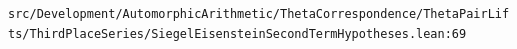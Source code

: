 \nolinkurl{src/Development/AutomorphicArithmetic/ThetaCorrespondence/ThetaPairLifts/ThirdPlaceSeries/SiegelEisensteinSecondTermHypotheses.lean:69}%

